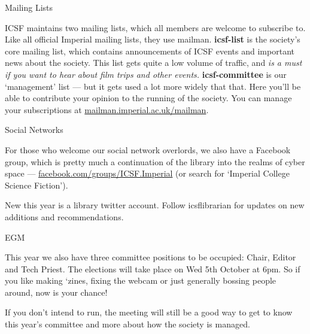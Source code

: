 \vspace{2mm} {\Large Mailing Lists}

ICSF maintains two mailing lists, which all members are welcome to subscribe to.
Like all official Imperial mailing lists, they use mailman.
%
\textbf{icsf-list} is the society's core mailing list, which contains
announcements of ICSF events and important news about the society.
This list gets quite a low volume of traffic, and \textit{is a must if
you want to hear about film trips and other events.}
%
\textbf{icsf-committee} is our `management' list --- but it gets used a
lot more widely that that. Here you'll be able to contribute your opinion
to the running of the society.
%
You can manage your subscriptions at \url{mailman.imperial.ac.uk/mailman}.

{\large Social Networks}

For those who welcome our social network overlords, we also have a Facebook
group, which is pretty much a continuation of the library into the
realms of cyber space --- \url{facebook.com/groups/ICSF.Imperial} (or search for
`Imperial College Science Fiction').

New this year is a library twitter account. Follow icsf\textunderscore librarian for updates on new additions and recommendations.

{\large EGM}

This year we also have three committee positions to be occupied: Chair, Editor and 
Tech Priest. The elections will take place on Wed 5th October at 6pm. So if you like making `zines, fixing the webcam or just generally bossing people around, now is your chance! 

If you don't intend to run, the meeting will still be a good way to get to know this year's committee and more about how the society is managed. 

\vspace{-10mm}